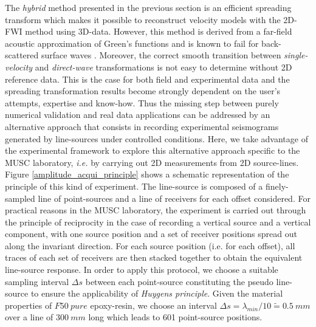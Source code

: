 \documentclass[manuscript,revised]{geophysics}
\begin{document}




\noindent The \textit{hybrid} method presented in the previous section is an efficient spreading transform which makes it possible to reconstruct velocity models with the 2D-FWI method using 3D-data. However, this method is derived from a far-field acoustic approximation of Green's functions and is known to fail for back-scattered surface waves \citep{Schafer_LSS_2014}. Moreover, the correct smooth transition between \textit{single-velocity} and \textit{direct-wave} transformations is not easy to determine without 2D reference data. This is the case for both field and experimental data and the spreading transformation results become strongly dependent on the user's attempts, expertise and know-how.
\noindent Thus the missing step between purely numerical validation and real data applications can be addressed by an alternative approach that consists in recording experimental seismograms generated by line-sources under controlled conditions. Here, we take advantage of the experimental framework to explore this alternative approach specific to the MUSC laboratory, \textit{i.e.} by carrying out 2D measurements from 2D source-lines. Figure \ref{amplitude_acqui_principle} shows a schematic representation of the principle of this kind of experiment. The line-source is composed of a finely-sampled line of point-sources and a line of receivers for each offset considered. 
\noindent For practical reasons in the MUSC laboratory, the experiment is carried out through the principle of reciprocity in the case of recording a vertical source and a vertical component, with one source position and a set of receiver positions spread out along the invariant direction. For each source position (i.e. for each offset), all traces of each set of receivers are then stacked together to obtain the equivalent line-source response. In order to apply this protocol, we choose a suitable sampling interval $\Delta s$ between each point-source constituting the pseudo line-source to ensure the applicability of \textit{Huygens principle}. Given the material properties of $F50\ pure$ epoxy-resin, we choose an interval $\Delta s=\lambda_{min}/10 \tilde{=}0.5\ mm$ over a line of $300\ mm$ long which leads to 601 point-source positions.
\end{document}
